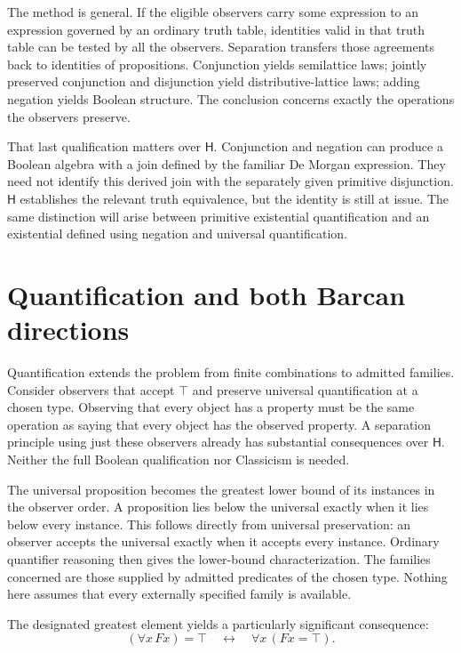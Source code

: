 \documentclass[12pt,letterpaper]{article}
\newcommand{\Hlogic}{\mathsf{H}}
\begin{document}
The method is general. If the eligible observers carry some expression to an expression governed by an ordinary truth table, identities valid in that truth table can be tested by all the observers. Separation transfers those agreements back to identities of propositions. Conjunction yields semilattice laws; jointly preserved conjunction and disjunction yield distributive-lattice laws; adding negation yields Boolean structure. The conclusion concerns exactly the operations the observers preserve.


That last qualification matters over $\Hlogic$. Conjunction and negation can produce a Boolean algebra with a join defined by the familiar De Morgan expression. They need not identify this derived join with the separately given primitive disjunction. $\Hlogic$ establishes the relevant truth equivalence, but the identity is still at issue. The same distinction will arise between primitive existential quantification and an existential defined using negation and universal quantification.~\cite[\S4]{r2}


\section{Quantification and both Barcan directions}

Quantification extends the problem from finite combinations to admitted families. Consider observers that accept $\top$ and preserve universal quantification at a chosen type. Observing that every object has a property must be the same operation as saying that every object has the observed property. A separation principle using just these observers already has substantial consequences over $\Hlogic$. Neither the full Boolean qualification nor Classicism is needed.


The universal proposition becomes the greatest lower bound of its instances in the observer order. A proposition lies below the universal exactly when it lies below every instance. This follows directly from universal preservation: an observer accepts the universal exactly when it accepts every instance. Ordinary quantifier reasoning then gives the lower-bound characterization. The families concerned are those supplied by admitted predicates of the chosen type. Nothing here assumes that every externally specified family is available.~\cite[\S3]{r3}


The designated greatest element yields a particularly significant consequence:
\[
(\forall x\,Fx)=\top \quad\longleftrightarrow\quad \forall x\,(Fx=\top).
\]
\end{document}

